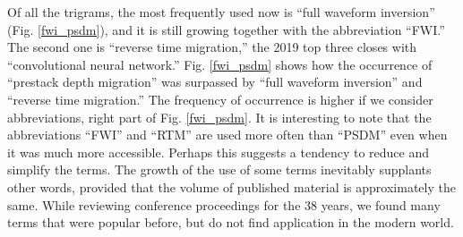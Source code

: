 \documentclass[geosciences,article,submit,moreauthors,pdftex]{Definitions/mdpi}
\begin{document}
Of all the trigrams, the most frequently used now is ``full waveform inversion'' (Fig. \ref{fwi_psdm}), and it is still growing together with the abbreviation ``FWI.'' The second one is ``reverse time migration,'' the 2019 top three closes with ``convolutional neural network.'' Fig. \ref{fwi_psdm} shows how the occurrence of ``prestack depth migration'' was surpassed by ``full waveform inversion'' and ``reverse time migration.'' The frequency of occurrence is higher if we consider abbreviations, right part of Fig. \ref{fwi_psdm}. It is interesting to note that the abbreviations ``FWI'' and ``RTM'' are used more often than ``PSDM'' even when it was much more accessible. Perhaps this suggests a tendency to reduce and simplify the terms. The growth of the use of some terms inevitably supplants other words, provided that the volume of published material is approximately the same. While reviewing conference proceedings for the 38 years, we found many terms that were popular before, but do not find application in the modern world. 
\end{document}
